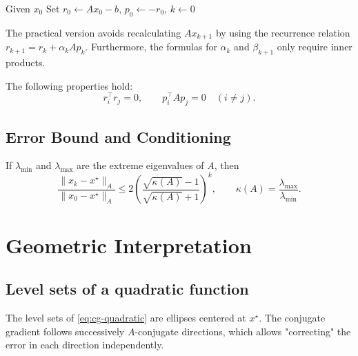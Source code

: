 \begin{algorithm}[H]
\caption{Conjugate Gradient (practical version)}
\label{alg:cg-practical}
Given $x_0$\;
Set $r_0 \leftarrow Ax_0 - b$, $p_0 \leftarrow -r_0$, $k \leftarrow 0$\;
\end{algorithm}

\begin{remarque}
The practical version avoids recalculating $Ax_{k+1}$ by using the recurrence relation $r_{k+1} = r_k + \alpha_k Ap_k$.
Furthermore, the formulas for $\alpha_k$ and $\beta_{k+1}$ only require inner products.
\end{remarque}

The following properties hold:
\[
r_i^\top r_j = 0, \qquad p_i^\top A p_j = 0 \quad(i\neq j).
\]

\subsection{Error Bound and Conditioning}

If $\lambda_{\min}$ and $\lambda_{\max}$ are the extreme eigenvalues of $A$, then
\[
\frac{\|x_k - x^\star\|_A}{\|x_0 - x^\star\|_A}
\le
2\left(\frac{\sqrt{\kappa(A)} - 1}{\sqrt{\kappa(A)} + 1}\right)^k,
\qquad
\kappa(A)=\frac{\lambda_{\max}}{\lambda_{\min}}.
\]

\section{Geometric Interpretation}

\subsection{Level sets of a quadratic function}

The level sets of \eqref{eq:cg-quadratic} are ellipses centered at $x^\star$.  
The conjugate gradient follows successively $A$-conjugate directions, which allows "correcting" the error in each direction independently.

